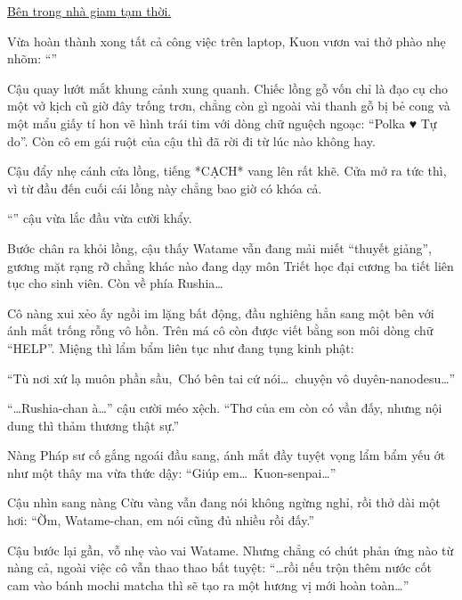\documentclass[../main.tex]{subfiles}
\begin{document}
\begin{center}
  \uline{Bên trong nhà giam tạm thời.}
\end{center}

Vừa hoàn thành xong tất cả công việc trên laptop, Kuon vươn vai thở phào nhẹ nhõm: ``''

Cậu quay lướt mắt khung cảnh xung quanh. Chiếc lồng gỗ vốn chỉ là đạo cụ cho một vở kịch cũ giờ đây trống trơn, chẳng còn gì ngoài vài thanh gỗ bị bẻ cong và một mẩu giấy tí hon vẽ hình trái tim với dòng chữ nguệch ngoạc: ``Polka ♥ Tự do''. Còn cô em gái ruột của cậu thì đã rời đi từ lúc nào không hay.

Cậu đẩy nhẹ cánh cửa lồng, tiếng *CẠCH* vang lên rất khẽ. Cửa mở ra tức thì, vì từ đầu đến cuối cái lồng này chẳng bao giờ có khóa cả.

``'' cậu vừa lắc đầu vừa cười khẩy.

Bước chân ra khỏi lồng, cậu thấy Watame vẫn đang mải miết ``thuyết giảng'', gương mặt rạng rỡ chẳng khác nào đang dạy môn Triết học đại cương ba tiết liên tục cho sinh viên. Còn về phía Rushia\dots

Cô nàng xui xẻo ấy ngồi im lặng bất động, đầu nghiêng hẳn sang một bên với ánh mắt trống rỗng vô hồn. Trên má cô còn được viết bằng son môi dòng chữ ``HELP''. Miệng thì lẩm bẩm liên tục như đang tụng kinh phật:

\begin{center}
  ``Tù nơi xứ lạ muôn phần sầu,\
  Chó bên tai cứ nói\dots\ chuyện vô duyên-nanodesu\dots''
\end{center}

``\dots Rushia-chan à\dots'' cậu cười méo xệch. ``Thơ của em còn có vần đấy, nhưng nội dung thì thảm thương thật sự.''

Nàng Pháp sư cố gắng ngoái đầu sang, ánh mắt đầy tuyệt vọng lẩm bẩm yếu ớt như một thây ma vừa thức dậy: ``Giúp em\dots\ Kuon-senpai\dots''

Cậu nhìn sang nàng Cừu vàng vẫn đang nói không ngừng nghỉ, rồi thở dài một hơi: ``Ờm, Watame-chan, em nói cũng đủ nhiều rồi đấy.''

Cậu bước lại gần, vỗ nhẹ vào vai Watame. Nhưng chẳng có chút phản ứng nào từ nàng cả, ngoài việc cô vẫn thao thao bất tuyệt: ``\dots rồi nếu trộn thêm nước cốt cam vào bánh mochi matcha thì sẽ tạo ra một hương vị mới hoàn toàn\dots''
\end{document}
